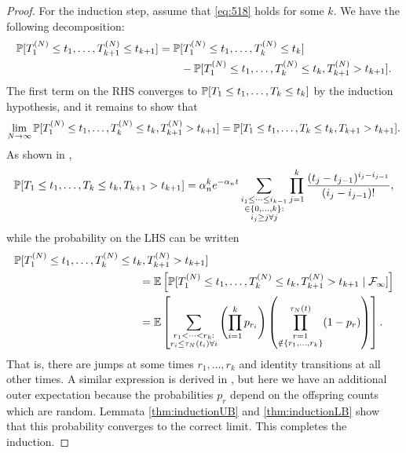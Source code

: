 \begin{proof}
For the induction step, assume that \eqref{eq:518} holds for some $k$. 
We have the following decomposition:
\begin{align*}
\mathbb{P}[ T_1^{(N)} \leq t_1, \dots , T_{k+1}^{(N)} \leq t_{k+1} ]
&= \mathbb{P}[ T_1^{(N)} \leq t_1, \dots , T_k^{(N)} \leq t_k ] \\
        &\qquad- \mathbb{P}[ T_1^{(N)} \leq t_1, \dots , T_k^{(N)} \leq t_k, T_{k+1}^{(N)} > t_{k+1} ] .
\end{align*}
The first term on the RHS converges to $\mathbb{P}[ T_1 \leq t_1, \dots , T_k \leq t_k ]$ by the induction hypothesis, and it remains to show that
\begin{equation*}
\lim_{N\to\infty} 
        \mathbb{P}[ T_1^{(N)} \leq t_1, \dots , T_k^{(N)} \leq t_k, T_{k+1}^{(N)} > t_{k+1} ]
= \mathbb{P}[ T_1\leq t_1, \dots , T_k \leq t_k, T_{k+1} > t_{k+1} ] .
\end{equation*}
As shown in \textcite{mohle1999},
\begin{equation*}
\mathbb{P}[ T_1\leq t_1, \dots , T_k \leq t_k, T_{k+1} > t_{k+1} ]
= \alpha_n^k e^{-\alpha_n t} 
        \sum_{\substack{i_1\leq \dots\leq i_{k-1}\\ \in \{0,\dots,k\} :
        \\ i_j \geq j \forall j}} 
        \prod_{j=1}^k \frac{(t_j - t_{j-1})^{i_j - i_{j-1}}}{(i_j - i_{j-1})! } ,
\end{equation*}
while the probability on the LHS can be written
\begin{align*}
&\Prob[ T_1^{(N)} \leq t_1, \dots , T_k^{(N)} \leq t_k, T_{k+1}^{(N)} > t_{k+1} ] \\
&\hspace{4cm}= \E\left[ \Prob[ T_1^{(N)} \leq t_1, \dots , T_k^{(N)} \leq t_k, T_{k+1}^{(N)} > t_{k+1} 
        \mid \mathcal{F}_\infty] \right] \\
&\hspace{4cm}= \E \left[ \sum_{\substack{r_1 <\dots< r_k :
        \\ r_i \leq \tau_N(t_i) \forall i}}
        \left( \prod_{i=1}^k p_{r_i} \right)
        \left( \prod_{\substack{r=1 \\ \notin \{r_1,\dots,r_k\} }}^{\tau_N(t)} 
        (1-p_r) \right) \right] .
\end{align*}
That is, there are jumps at some times $r_1, \dots, r_k$ and identity transitions at all other times.
A similar expression is derived in \textcite{mohle1999}, but here we have an additional outer expectation because the probabilities $p_r$ depend on the offspring counts which are random.
Lemmata \ref{thm:inductionUB} and \ref{thm:inductionLB} show that this probability converges to the correct limit.
This completes the induction.
\end{proof}


